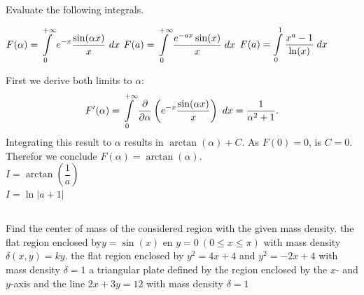 \begin{Exercise}[difficulty = 3] Evaluate the following integrals.
\begin{multicols}{2}
    \Question $F(\alpha) = \displaystyle \int\limits_{0}^{+\infty} e^{-x} \dfrac{\sin(\alpha x)}{x} \ dx $
    \Question $F(a)=\displaystyle \int\limits_0^{+\infty} \dfrac{e^{-ax} \sin (x)}{x} \; dx $ %
    \Question $F(a)=\displaystyle \int\limits_0^{1} \dfrac{x^a - 1}{\ln (x)} \; dx $ %
        \EndCurrentQuestion
\end{multicols}
\end{Exercise}

\begin{Answer}
    First we derive both limits to $\alpha$:
    \[F'(\alpha) = \displaystyle \int\limits_{0}^{+\infty} \dfrac{\partial}{\partial \alpha} \left( e^{-x} \dfrac{\sin(\alpha x)}{x} \right) \ dx = \dfrac{1}{\alpha^2 + 1}. \]
    Integrating this result to $\alpha$ results in $\arctan(\alpha) + C$. As $F(0)=0$, is $C=0$. Therefor we conclude $F(\alpha) = \arctan(\alpha)$.
    \\ $I=\arctan\left(\dfrac{1}{a}\right) $
    \\ $I= \ln|a+1|$
\end{Answer}

\subsection*{}
\begin{Exercise} Find the center of mass of the considered region with the given mass density.
        \Question[difficulty = 1]  the flat region enclosed by$y= \sin (x)$ en $y=0 \ (0\leq x \leq \pi)$ with mass density \\ $\delta(x,y) = ky$. 
        \Question[difficulty = 2]  the flat region enclosed by $y^2 = 4x + 4$ and $y^2 = -2x+4$ with mass density $\delta = 1$ 
        \Question[difficulty = 2]  a triangular plate defined by the region enclosed by the $x$- and $y$-axis and the line $2x+3y=12$ with mass density $\delta = 1$
\end{Exercise}

